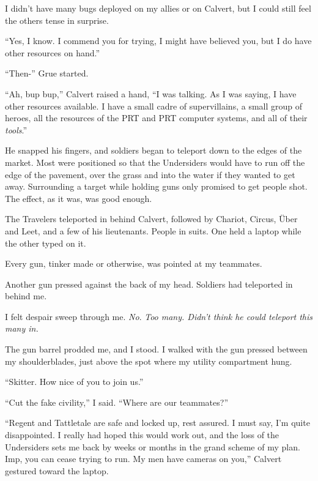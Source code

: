 I didn't have many bugs deployed on my allies or on Calvert, but I could still feel the others tense in surprise.



``Yes, I know.  I commend you for trying, I might have believed you, but I do have other resources on hand.''



``Then-'' Grue started.



``Ah, bup bup,'' Calvert raised a hand, ``I was talking.  As I was saying, I have other resources available.  I have a small cadre of supervillains, a small group of heroes, all the resources of the PRT and PRT computer systems, and all of their \emph{tools}.''



He snapped his fingers, and soldiers began to teleport down to the edges of the market.  Most were positioned so that the Undersiders would have to run off the edge of the pavement, over the grass and into the water if they wanted to get away.  Surrounding a target while holding guns only promised to get people shot.  The effect, as it was, was good enough.



The Travelers teleported in behind Calvert, followed by Chariot, Circus, \"{U}ber and Leet, and a few of his lieutenants.  People in suits.  One held a laptop while the other typed on it.



Every gun, tinker made or otherwise, was pointed at my teammates.



Another gun pressed against the back of my head.  Soldiers had teleported in behind me.



I felt despair sweep through me.  \emph{No}.\emph{  Too many.  Didn't think he could teleport this many in.}



The gun barrel prodded me, and I stood.  I walked with the gun pressed between my shoulderblades, just above the spot where my utility compartment hung.



``Skitter.  How nice of you to join us.''



``Cut the fake civility,'' I said.  ``Where are our teammates?''



``Regent and Tattletale are safe and locked up, rest assured.  I must say, I'm quite disappointed.  I really had hoped this would work out, and the loss of the Undersiders sets me back by weeks or months in the grand scheme of my plan.  Imp, you can cease trying to run.  My men have cameras on you,'' Calvert gestured toward the laptop.



